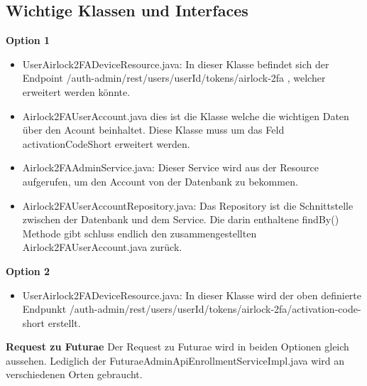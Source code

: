 \subsection{Wichtige Klassen und Interfaces}
\textbf{Option 1}
\begin{itemize}
	\item UserAirlock2FADeviceResource.java: In dieser Klasse befindet sich der Endpoint \flqq /auth-admin/rest/users/{userId}/tokens/airlock-2fa \frqq{}, welcher erweitert werden könnte. 
	\item Airlock2FAUserAccount.java dies ist die Klasse welche die wichtigen Daten über den Acount beinhaltet. Diese Klasse muss um das Feld \flqq activationCodeShort\frqq{} erweitert werden.
	\item Airlock2FAAdminService.java: Dieser Service wird aus der Resource aufgerufen, um den Account von der Datenbank zu bekommen.
	\item Airlock2FAUserAccountRepository.java: Das Repository ist die Schnittstelle zwischen der Datenbank und dem Service. Die darin enthaltene \flqq findBy()\frqq{} Methode gibt schluss endlich den zusammengestellten \flqq Airlock2FAUserAccount.java\frqq{} zurück.
\end{itemize}
\textbf{Option 2}
\begin{itemize}
	\item UserAirlock2FADeviceResource.java: In dieser Klasse wird der oben definierte Endpunkt \flqq /auth-admin/rest/users/{userId}/tokens/airlock-2fa/activation-code-short \frqq{} erstellt.
\end{itemize}
\textbf{Request zu Futurae}\newline
Der Request zu Futurae wird in beiden Optionen gleich aussehen. Lediglich der \flqq FuturaeAdminApiEnrollmentServiceImpl.java\frqq{} wird an verschiedenen Orten gebraucht.
